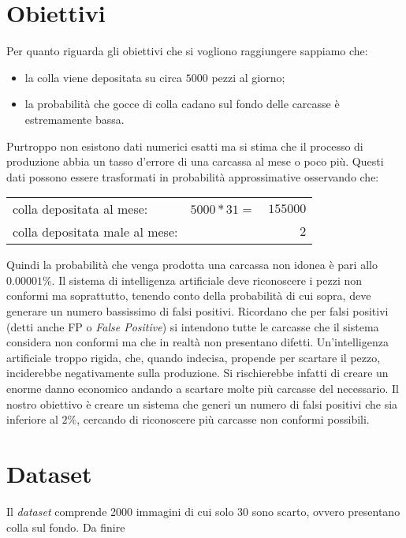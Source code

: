 \documentclass[a0,portrait]{a0poster}
\begin{document}
\begin{multicols}{2}
\section*{Obiettivi}
Per quanto riguarda gli obiettivi che si vogliono raggiungere sappiamo che:
\begin{itemize}
  \item la colla viene depositata su circa $5000$ pezzi al giorno;
  \item la probabilità che gocce di colla cadano sul fondo delle carcasse è estremamente bassa.
\end{itemize}
Purtroppo non esistono dati numerici esatti ma si stima che il processo di produzione abbia un tasso d'errore di una carcassa al mese o poco più.
Questi dati possono essere trasformati in probabilità approssimative osservando che:
\begin{center}
  \begin{tabular}{ l c r }
    colla depositata al mese: & $5000 * 31 =$& $155000$ \\
    colla depositata male al mese: && $2$
  \end{tabular}
\end{center}
Quindi la probabilità che venga prodotta una carcassa non idonea è pari allo $0.00001\%$.
Il sistema di intelligenza artificiale deve riconoscere i pezzi non conformi ma soprattutto, tenendo conto della probabilità di cui sopra, deve generare un numero bassissimo di falsi positivi.
Ricordano che per falsi positivi (detti anche FP o \textit{False Positive}) si intendono tutte le carcasse che il sistema considera non conformi ma che in realtà non presentano difetti.
Un'intelligenza artificiale troppo rigida, che, quando indecisa, propende per scartare il pezzo, inciderebbe negativamente sulla produzione.
Si rischierebbe infatti di creare un enorme danno economico andando a scartare molte più carcasse del necessario.
Il nostro obiettivo è creare un sistema che generi un numero di falsi positivi che sia inferiore al $2\%$, cercando di riconoscere più carcasse non conformi possibili.


\section*{Dataset}
Il \textit{dataset} comprende 2000 immagini di cui solo 30 sono scarto, ovvero presentano colla sul fondo.
Da finire


\end{multicols}
\end{document}
